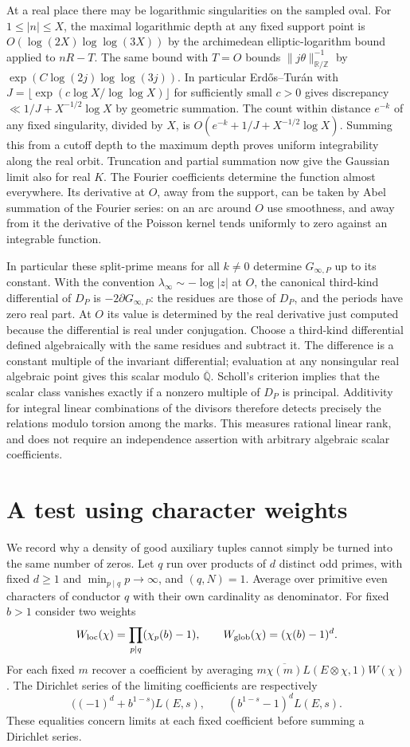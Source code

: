 \documentclass[11pt]{article}
\newcommand{\Q}{\mathbb Q}\newcommand{\Z}{\mathbb Z}\newcommand{\F}{\mathbb F}
\begin{document}
At a real place there may be logarithmic singularities on the sampled oval. For $1\le |n|\le X$, the maximal logarithmic depth at any fixed support point is $O(\log(2X)\log\log(3X))$ by the archimedean elliptic-logarithm bound \cite[Prop.~4.1]{BS} applied to $nR-T$. The same bound with $T=O$ bounds $\|j\theta\|_{\mathbb R/\mathbb Z}^{-1}$ by $\exp(C\log(2j)\log\log(3j))$. In particular Erd\H{o}s--Tur\'an with $J=\lfloor\exp(c\log X/\log\log X)\rfloor$ for sufficiently small $c>0$ gives discrepancy $\ll 1/J+X^{-1/2}\log X$ by geometric summation. The count within distance $e^{-k}$ of any fixed singularity, divided by $X$, is $O(e^{-k}+1/J+X^{-1/2}\log X)$. Summing this from a cutoff depth to the maximum depth proves uniform integrability along the real orbit. Truncation and partial summation now give the Gaussian limit also for real $K$. The Fourier coefficients determine the function almost everywhere. Its derivative at $O$, away from the support, can be taken by Abel summation of the Fourier series: on an arc around $O$ use smoothness, and away from it the derivative of the Poisson kernel tends uniformly to zero against an integrable function.

In particular these split-prime means for all $k\ne0$ determine $G_{\infty,P}$ up to its constant. With the convention $\lambda_\infty\sim-\log|z|$ at $O$, the canonical third-kind differential of $D_P$ is $-2\partial G_{\infty,P}$: the residues are those of $D_P$, and the periods have zero real part. At $O$ its value is determined by the real derivative just computed because the differential is real under conjugation. Choose a third-kind differential defined algebraically with the same residues and subtract it. The difference is a constant multiple of the invariant differential; evaluation at any nonsingular real algebraic point gives this scalar modulo $\overline{\Q}$. Scholl's criterion \cite[Thm.~3.2]{BO} implies that the scalar class vanishes exactly if a nonzero multiple of $D_P$ is principal. Additivity for integral linear combinations of the divisors therefore detects precisely the relations modulo torsion among the marks. This measures rational linear rank, and does not require an independence assertion with arbitrary algebraic scalar coefficients.

\section{A test using character weights}
We record why a density of good auxiliary tuples cannot simply be turned into the same number of zeros. Let $q$ run over products of $d$ distinct odd primes, with fixed $d\ge1$ and $\min_{p\mid q}p\to\infty$, and $(q,N)=1$. Average over primitive even characters of conductor $q$ with their own cardinality as denominator. For fixed $b>1$ consider two weights
\[
 W_{\rm loc}(\chi)=\prod_{p\mid q}(\chi_p(b)-1),\qquad
 W_{\rm glob}(\chi)=(\chi(b)-1)^d.
\]
For each fixed $m$ recover a coefficient by averaging $m\overline{\chi(m)}L(E\otimes\chi,1)W(\chi)$. The Dirichlet series of the limiting coefficients are respectively
\[
 \bigl((-1)^d+b^{1-s}\bigr)L(E,s),\qquad
 (b^{1-s}-1)^d L(E,s).
\]
These equalities concern limits at each fixed coefficient before summing a Dirichlet series.
\end{document}
